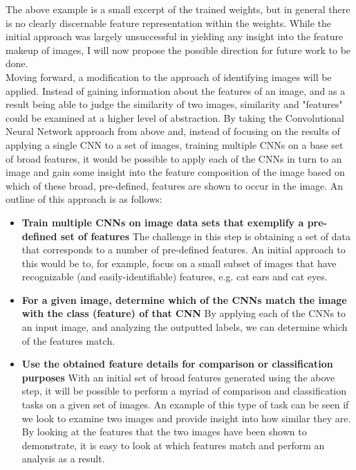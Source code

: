 \documentclass[12pt, titlepage]{article}
\begin{document}
The above example is a small excerpt of the trained weights, but in general there is no clearly discernable feature representation within the weights.
While the initial approach was largely unsuccessful in yielding any insight into the feature makeup of images, I will now propose the possible
direction for future work to be done. \\
\vspace{3mm}
Moving forward, a modification to the approach of identifying images will be applied. Instead of gaining information about the
features of an image, and as a result being able to judge the similarity of two images, similarity and "features" could
be examined at a higher level of abstraction. By taking the Convolutional Neural Network approach from above and, instead of focusing on the results
of applying a single CNN to a set of images, training multiple CNNs on a base set of broad features, it would be possible to apply each of the CNNs
in turn to an image and gain some insight into the feature composition of the image based on which of these broad, pre-defined, features are shown to
occur in the image. An outline of this approach is as follows: \\
\begin{itemize}
  \item \textbf{Train multiple CNNs on image data sets that exemplify a pre-defined set of features}
  		The challenge in this step is obtaining a set of data that corresponds to a number of pre-defined
  		features. An initial approach to this would be to, for example, focus on a small subset of images that
  		have recognizable (and easily-identifiable) features, e.g. cat ears and cat eyes.
  \item \textbf{For a given image, determine which of the CNNs match the image with the class (feature) of that CNN}
  		By applying each of the CNNs to an input image, and analyzing the outputted labels, we can determine
  		which of the features match.
  \item \textbf{Use the obtained feature details for comparison or classification purposes}
  		With an initial set of broad features generated using the above step, it will be possible to perform
  		a myriad of comparison and classification tasks on a given set of images. An example of this type of task can be seen
  		if we look to examine two images and provide insight into how similar they are. By looking at the features that the two images
  		have been shown to demonstrate, it is easy to look at which features match and perform an analysis as a result.
\end{itemize}
\end{document}

